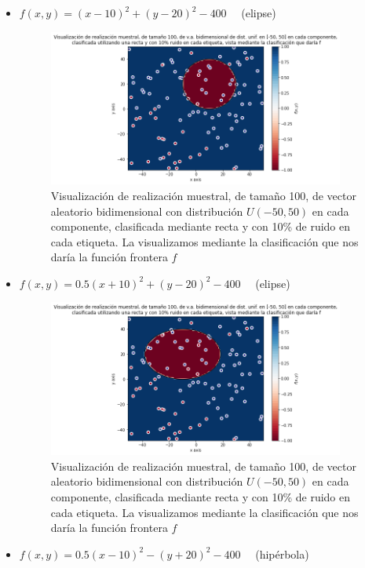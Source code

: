 \documentclass[11pt,a4paper]{article}
\theoremstyle{definition}
\begin{document}
	\begin{itemize}
	
	\item $f(x,y)=(x-10)^2+(y-20)^2-400$ \ \ (elipse)
	\begin{figure}[H]
		\centering
		\includegraphics[width=0.92\textwidth]{images/1_2_c_f1}
		\caption{Visualización de realización muestral, de tamaño 100, de vector aleatorio bidimensional con distribución $U(-50,50)$ en cada componente, clasificada mediante recta y con 10\% de ruido en cada etiqueta. La visualizamos mediante la clasificación que nos daría la función frontera $f$}
	\end{figure}
	\item $f(x,y)=0.5(x+10)^2+(y-20)^2-400$ \ \ (elipse)
	\begin{figure}[H]
		\centering
		\includegraphics[width=0.92\textwidth]{images/1_2_c_f2}
		\caption{Visualización de realización muestral, de tamaño 100, de vector aleatorio bidimensional con distribución $U(-50,50)$ en cada componente, clasificada mediante recta y con 10\% de ruido en cada etiqueta. La visualizamos mediante la clasificación que nos daría la función frontera $f$}
	\end{figure}
	\item $f(x,y)=0.5(x-10)^2-(y+20)^2-400$ \ \ (hipérbola)

\end{itemize}
\end{document}
